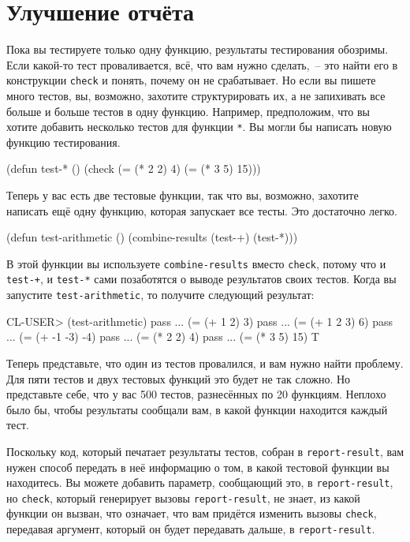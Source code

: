 \section{Улучшение отчёта}

Пока вы тестируете только одну функцию, результаты тестирования обозримы. Если какой-то
тест проваливается, всё, что вам нужно сделать,~-- это найти его в конструкции \lstinline{check}
и понять, почему он не срабатывает. Но если вы пишете много тестов, вы, возможно, захотите
структурировать их, а не запихивать все больше и больше тестов в одну функцию. Например,
предположим, что вы хотите добавить несколько тестов для функции \lstinline{*}. Вы могли бы
написать новую функцию тестирования.

\begin{myverb}
(defun test-* ()
  (check
    (= (* 2 2) 4)
    (= (* 3 5) 15)))
\end{myverb}

Теперь у вас есть две тестовые функции, так что вы, возможно, захотите написать ещё одну
функцию, которая запускает все тесты. Это достаточно легко.

\begin{myverb}
(defun test-arithmetic ()
  (combine-results
   (test-+)
   (test-*)))
\end{myverb}

В этой функции вы используете \lstinline{combine-results} вместо \lstinline{check}, потому что и
\lstinline{test-+}, и \lstinline{test-*} сами позаботятся о выводе результатов своих тестов. Когда
вы запустите \lstinline{test-arithmetic}, то получите следующий результат:

\begin{myverb}
CL-USER> (test-arithmetic)
pass ... (= (+ 1 2) 3)
pass ... (= (+ 1 2 3) 6)
pass ... (= (+ -1 -3) -4)
pass ... (= (* 2 2) 4)
pass ... (= (* 3 5) 15)
T
\end{myverb}

Теперь представьте, что один из тестов провалился, и вам нужно найти проблему. Для пяти
тестов и двух тестовых функций это будет не так сложно. Но представьте себе, что у вас 500
тестов, разнесённых по 20 функциям. Неплохо было бы, чтобы результаты сообщали вам, в
какой функции находится каждый тест.

Поскольку код, который печатает результаты тестов, собран в \lstinline{report-result}, вам
нужен способ передать в неё информацию о том, в какой тестовой функции вы находитесь. Вы
можете добавить параметр, сообщающий это, в \lstinline{report-result}, но \lstinline{check}, который
генерирует вызовы \lstinline{report-result}, не знает, из какой функции он вызван, что
означает, что вам придётся изменить вызовы \lstinline{check}, передавая аргумент, который он
будет передавать дальше, в \lstinline{report-result}.

